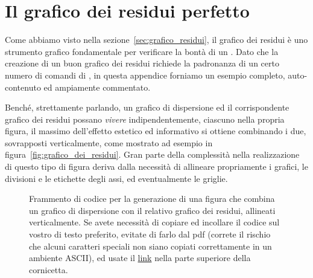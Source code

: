 \chapter{Il grafico dei residui perfetto}

Come abbiamo visto nella sezione~\ref{sec:grafico_residui}, il grafico dei residui
è uno strumento grafico fondamentale per verificare la bontà di un \fit.
Dato che la creazione di un buon grafico dei residui richiede la padronanza
di un certo numero di comandi di \matplotlib, in questa appendice forniamo un
esempio completo, auto-contenuto ed ampiamente commentato.

Benché, strettamente parlando, un grafico di dispersione ed il corrispondente
grafico dei residui possano \emph{vivere} indipendentemente, ciascuno nella propria
figura, il massimo dell'effetto estetico ed informativo si ottiene combinando i
due, sovrapposti verticalmente, come mostrato ad esempio
in figura~\ref{fig:grafico_dei_residui}.
Gran parte della complessità nella realizzazione di questo tipo di figura deriva
dalla necessità di allineare propriamente i grafici, le divisioni e le etichette
degli assi, ed eventualmente le griglie.


\begin{figure}[htbp!]
  
  \caption{Frammento di codice per la generazione di una figura che combina un
  grafico di dispersione con il relativo grafico dei residui, allineati verticalmente.
  Se avete necessità di copiare ed incollare il codice sul vostro 
  di testo preferito, evitate di farlo dal pdf (correte il rischio che alcuni
  caratteri speciali non siano copiati correttamente in un ambiente ASCII), ed usate il
  \href{https://bitbucket.org/lbaldini/statnotes/src/master/snippets/residual_plot.py}{link}
  nella parte superiore della cornicetta.}
  \label{fig:grafico_residui}
\end{figure}

